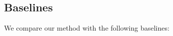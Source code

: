 \begin{definition}
\noindent\hrulefill
\end{definition}
\fi



\subsection{Baselines}
We compare our method with the following baselines:

